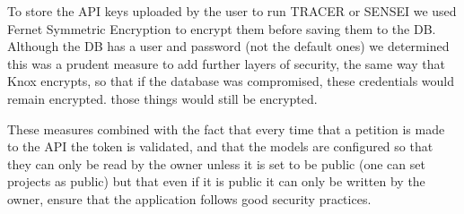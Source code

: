 To store the \ac{API} keys uploaded by the user to run \ac{TRACER} or SENSEI
we used Fernet Symmetric Encryption \autocite{FernetSymmetricEncryption}
to encrypt them before saving them to the \ac{DB}.
Although the \ac{DB} has a user and password (not the default ones)
we determined this was a prudent measure to add further layers of security,
the same way that Knox encrypts, so that
if the database was compromised, these credentials would remain encrypted.
those things would still be encrypted.

These measures combined with the fact that
every time that a petition is made to the \ac{API} the token is validated,
and that the models are configured so that they can only be
read by the owner unless it is set to be public (one can set projects as public)
but that even if it is public it can only be written by the owner,
ensure that the application follows good security practices.
